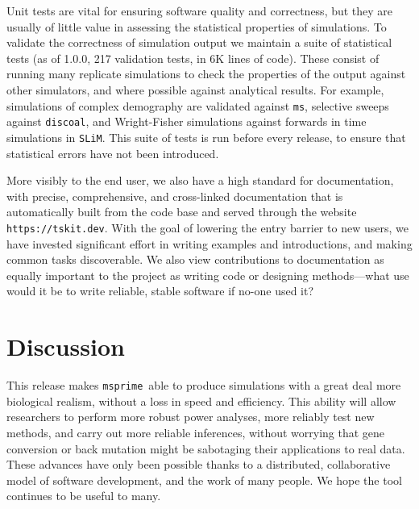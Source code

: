 \documentclass{article}
\newcommand{\msprime}[0]{\texttt{msprime}}
\newcommand{\ms}[0]{\texttt{ms}}
\newcommand{\SLiM}[0]{\texttt{SLiM}}
\newcommand{\discoal}[0]{\texttt{discoal}}
\begin{document}
Unit tests are vital for ensuring software quality and correctness, but
they are usually of little value in assessing the statistical properties
of simulations. To validate the correctness of simulation output
we maintain a suite of statistical tests (as of 1.0.0,
217 validation tests, in 6K lines of code). These consist of running many
replicate simulations to check the properties of the output
against other simulators, and where possible against analytical results.
For example, simulations of complex demography are validated against \ms,
selective sweeps against \discoal, and Wright-Fisher simulations
against forwards in time simulations in \SLiM.
This suite of tests is run before every release, to ensure
that statistical errors have not been introduced.

More visibly to the end user, we also have a high standard for documentation,
with precise, comprehensive, and cross-linked documentation
that is automatically built from the code base
and served through the website \texttt{https://tskit.dev}.
With the goal of lowering the entry barrier to new users,
we have invested significant effort in writing examples and introductions,
and making common tasks discoverable.
We also view contributions to documentation as equally important to the project
as writing code or designing methods---what use would it be
to write reliable, stable software if no-one used it?

\section*{Discussion}


This release makes \msprime\ able to produce simulations
with a great deal more biological realism, without a loss in speed and efficiency.
This ability will allow researchers to perform more robust
power analyses, more reliably test new methods,
and carry out more reliable inferences,
without worrying that gene conversion or back mutation might be sabotaging
their applications to real data.
These advances have only been possible thanks to a distributed,
collaborative model of software development,
and the work of many people.
We hope the tool continues to be useful to many.

\end{document}
